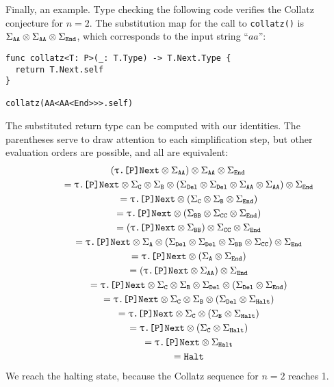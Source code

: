 \documentclass[../generics]{subfiles}
\begin{document}
Finally, an example. Type checking the following code verifies the Collatz conjecture for $n=2$. The substitution map for the call to \texttt{collatz()} is $\Sigma_{\texttt{AA}}\otimes\Sigma_{\texttt{AA}}\otimes\Sigma_{\texttt{End}}$, which corresponds to the input string ``$aa$'':
\begin{Verbatim}
func collatz<T: P>(_: T.Type) -> T.Next.Type {
  return T.Next.self
}

collatz(AA<AA<End>>>.self)
\end{Verbatim}
The substituted return type can be computed with our identities. The parentheses serve to draw attention to each simplification step, but other evaluation orders are possible, and all are equivalent:
\begin{gather*}
\left(\texttt{$\uptau$.[P]Next}\otimes\Sigma_{\texttt{AA}}\right)\otimes\Sigma_{\texttt{AA}}\otimes\Sigma_{\texttt{End}}\\
\qquad {} = \texttt{$\uptau$.[P]Next} \otimes \Sigma_{\texttt{C}} \otimes \Sigma_{\texttt{B}} \otimes \left(\Sigma_{\texttt{Del}} \otimes \Sigma_{\texttt{Del}} \otimes \Sigma_{\texttt{AA}}\otimes\Sigma_{\texttt{AA}}\right)\otimes\Sigma_{\texttt{End}}\\
\qquad {} = \texttt{$\uptau$.[P]Next} \otimes \left(\Sigma_{\texttt{C}} \otimes \Sigma_{\texttt{B}} \otimes\Sigma_{\texttt{End}}\right)\\
\qquad {} = \texttt{$\uptau$.[P]Next} \otimes \left(\Sigma_{\texttt{BB}} \otimes \Sigma_{\texttt{CC}} \otimes\Sigma_{\texttt{End}}\right)\\
\qquad {} = \left(\texttt{$\uptau$.[P]Next}\otimes\Sigma_{\texttt{BB}}\right)\otimes\Sigma_{\texttt{CC}}\otimes\Sigma_{\texttt{End}}\\
\qquad {} = \texttt{$\uptau$.[P]Next}\otimes\Sigma_{\texttt{A}} \otimes \left(\Sigma_{\texttt{Del}} \otimes \Sigma_{\texttt{Del}} \otimes \Sigma_{\texttt{BB}}\otimes\Sigma_{\texttt{CC}}\right)\otimes\Sigma_{\texttt{End}}\\
\qquad {} = \texttt{$\uptau$.[P]Next}\otimes\left(\Sigma_{\texttt{A}} \otimes \Sigma_{\texttt{End}}\right)\\
\qquad {} = \left(\texttt{$\uptau$.[P]Next}\otimes\Sigma_{\texttt{AA}}\right) \otimes \Sigma_{\texttt{End}}\\
\qquad {} = \texttt{$\uptau$.[P]Next} \otimes \Sigma_{\texttt{C}} \otimes \Sigma_{\texttt{B}} \otimes \Sigma_{\texttt{Del}} \otimes \left( \Sigma_{\texttt{Del}} \otimes \Sigma_{\texttt{End}}\right)\\
\qquad {} = \texttt{$\uptau$.[P]Next} \otimes \Sigma_{\texttt{C}} \otimes \Sigma_{\texttt{B}} \otimes \left(\Sigma_{\texttt{Del}} \otimes \Sigma_{\texttt{Halt}}\right)\\
\qquad {} = \texttt{$\uptau$.[P]Next} \otimes \Sigma_{\texttt{C}} \otimes \left(\Sigma_{\texttt{B}} \otimes \Sigma_{\texttt{Halt}}\right)\\
\qquad {} = \texttt{$\uptau$.[P]Next} \otimes \left(\Sigma_{\texttt{C}} \otimes \Sigma_{\texttt{Halt}}\right)\\
\qquad {} = \texttt{$\uptau$.[P]Next} \otimes \Sigma_{\texttt{Halt}}\\
\qquad {} = \texttt{Halt}
\end{gather*}
We reach the halting state, because the Collatz sequence for $n=2$ reaches 1.
\end{document}
